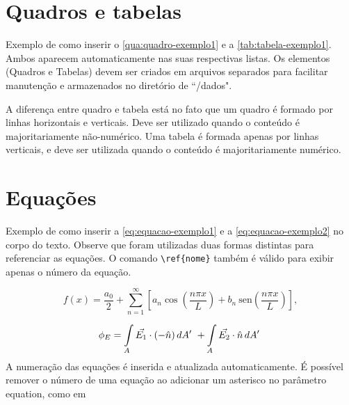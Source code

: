 \section{Quadros e tabelas}
\label{sec:quadrosTabelas}

Exemplo de como inserir o \autoref{qua:quadro-exemplo1} e a \cref{tab:tabela-exemplo1}. Ambos aparecem automaticamente nas suas respectivas listas.
Os elementos (Quadros e Tabelas) devem ser criados em arquivos separados para facilitar manutenção e armazenados no diretório de ``/dados".



A diferença entre quadro e tabela está no fato que um quadro é formado por linhas horizontais e verticais. Deve ser utilizado quando o conteúdo é majoritariamente não-numérico. Uma tabela é formada apenas por linhas verticais, e deve ser utilizada quando o conteúdo é majoritariamente numérico.



\section{Equações}
\label{sec:equacoes}

Exemplo de como inserir a \autoref{eq:equacao-exemplo1} e a \cref{eq:equacao-exemplo2} no corpo do texto. Observe que foram utilizadas duas formas distintas para referenciar as equações. O comando \verb|\ref{nome}| também é válido para exibir apenas o número da equação.

\begin{equation}
    \label{eq:equacao-exemplo1}
    f(x) = \frac{a_0}{2} + \sum_{n=1}^{\infty} \left[a_n \cos{ \left( \frac{ n\pi x}{L} \right) }  +  b_n  \: \mathrm{sen}{ \left( \frac{ n\pi x}{L} \right) }     \right]
    ,
\end{equation}

\begin{align}
    \phi_E  = \int \limits_{A} \Vec{E_1}\cdot (-\Hat{n}) \, dA'\ + \int \limits_{A} \Vec{E_2}\cdot \Hat{n} \, dA'\
    \label{eq:equacao-exemplo2}
\end{align}
\noindent
A numeração das equações é inserida e atualizada automaticamente. É possível remover o número de uma equação ao adicionar um asterisco no parâmetro  {\ttfamily equation}, como em

